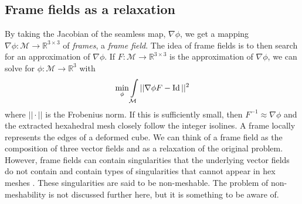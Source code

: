\documentclass[../thesis.tex]{subfiles}
\begin{document}
\subsection{Frame fields as a relaxation}
By taking the Jacobian of the seamless map, $\nabla \phi$, we get a mapping
$\nabla \phi : \mathcal{M} \to \mathbb{R}^{3\times3}$ of \emph{frames}, a \emph{frame field}.
The idea of frame fields is to then search for an approximation of $\nabla \phi$.
If $F: \mathcal{M} \to \mathbb{R}^{3\times3}$ is the approximation of $\nabla \phi$, we can
solve for $\phi : \mathcal{M} \to \mathbb{R}^3$ with
\begin{equation}\label{eq:poisson}
  \min \limits_{\phi} \int \limits_{\mathcal{M}} ||\nabla \phi F - \Id||^2
\end{equation}
where $||\cdot||$ is the Frobenius norm. If this is sufficiently small, then $F^{-1} \approx \nabla \phi$ and 
the extracted hexahedral mesh closely follow the integer isolines.
A frame locally represents the edges of a deformed cube.
We can think of a frame field as the composition of three vector fields
and as a relaxation of the original problem. However, frame fields
can contain singularities that the underlying vector fields do not contain \cite{Nieser}
and contain types of singularities that cannot appear in hex meshes \cite{Liu}.
These singularities are said to be non-meshable.
The problem of non-meshability is not discussed further here, but it
is something to be aware of.
\end{document}
